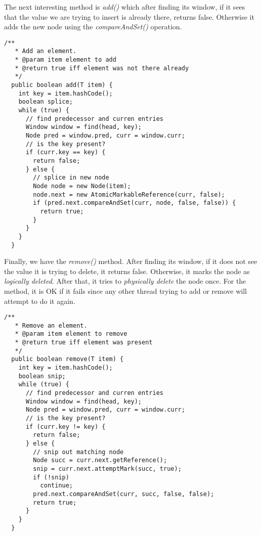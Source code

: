 \hfill
\par
The next interesting method is \textit{add()} which after finding its window, if
it sees that the value we are trying to insert is already there, returns false.
Otherwise it adds the new node using the \textit{compareAndSet()} operation.
\par
\hfill
\begin{lstlisting}[style=numbers]
  /**
   * Add an element.
   * @param item element to add
   * @return true iff element was not there already
   */
  public boolean add(T item) {
    int key = item.hashCode();
    boolean splice;
    while (true) {
      // find predecessor and curren entries
      Window window = find(head, key);
      Node pred = window.pred, curr = window.curr;
      // is the key present?
      if (curr.key == key) {
        return false;
      } else {
        // splice in new node
        Node node = new Node(item);
        node.next = new AtomicMarkableReference(curr, false);
        if (pred.next.compareAndSet(curr, node, false, false)) {
          return true;
        }
      }
    }
  }
\end{lstlisting}
\hfill
\par
Finally, we have the \textit{remove()} method. After finding its window, if it
does not see the value it is trying to delete, it returns false. Otherwise, it
marks the node as \textit{logically deleted}. After that, it tries to
\textit{physically delete} the node once. For the method, it is OK if it fails
since any other thread trying to add or remove will attempt to do it again.
\par
\hfill
\begin{lstlisting}[style=numbers]
  /**
   * Remove an element.
   * @param item element to remove
   * @return true iff element was present
   */
  public boolean remove(T item) {
    int key = item.hashCode();
    boolean snip;
    while (true) {
      // find predecessor and curren entries
      Window window = find(head, key);
      Node pred = window.pred, curr = window.curr;
      // is the key present?
      if (curr.key != key) {
        return false;
      } else {
        // snip out matching node
        Node succ = curr.next.getReference();
        snip = curr.next.attemptMark(succ, true);
        if (!snip)
          continue;
        pred.next.compareAndSet(curr, succ, false, false);
        return true;
      }
    }
  }
\end{lstlisting}
\hfill
\par
